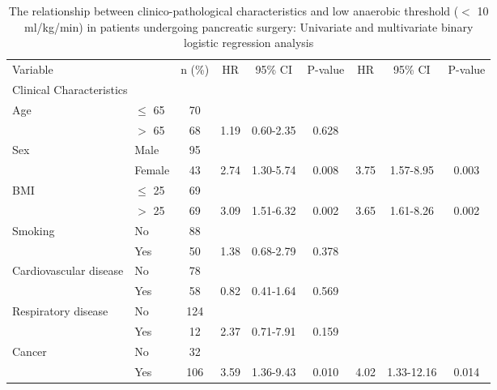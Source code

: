 \begin{sidewaystable}[p]
	\caption{The relationship between clinico-pathological characteristics and low anaerobic threshold ($<$ 10 ml/kg/min) in patients undergoing pancreatic surgery: Univariate and multivariate binary logistic regression analysis}
	\label{table:cpet_oj_table5}
	\centering
	\begin{tabular}{l l c c c c c c c}
		Variable                &           & n (\%) & HR   & 95\% CI    & P-value & HR   & 95\% CI    & P-value \\
		\multicolumn{9}{l}{Clinical Characteristics}                                                             \\
		Age                     & $\leq$ 65 & 70     &      &            &         &      &            &  \\
		                        & $>$ 65    & 68     & 1.19 & 0.60-2.35  & 0.628   &      &            &  \\
		Sex                     & Male      & 95     &      &            &         &      &            &  \\
		                        & Female    & 43     & 2.74 & 1.30-5.74  & 0.008   & 3.75 & 1.57-8.95  & 0.003   \\
		BMI                     & $\leq$ 25 & 69     &      &            &         &      &            &  \\
		                        & $>$ 25    & 69     & 3.09 & 1.51-6.32  & 0.002   & 3.65 & 1.61-8.26  & 0.002   \\
		Smoking                 & No        & 88     &      &            &         &      &            &  \\
		                        & Yes       & 50     & 1.38 & 0.68-2.79  & 0.378   &      &            &  \\
		Cardiovascular disease  & No        & 78     &      &            &         &      &            &  \\
		                        & Yes       & 58     & 0.82 & 0.41-1.64  & 0.569   &      &            &  \\
		Respiratory disease     & No        & 124    &      &            &         &      &            &  \\
		                        & Yes       & 12     & 2.37 & 0.71-7.91  & 0.159   &      &            &  \\
		Cancer                  & No        & 32     &      &            &         &      &            &  \\
		                        & Yes       & 106    & 3.59 & 1.36-9.43  & 0.010   & 4.02 & 1.33-12.16 & 0.014   \\

\end{tabular}
\end{sidewaystable}

